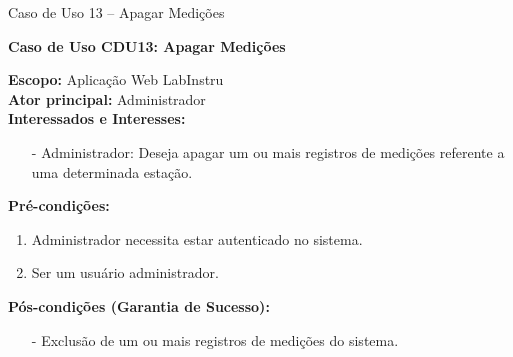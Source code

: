 \begin{mdframed}
\begin{flushleft}
\begin{itemize}
		\end{itemize}

		\end{flushleft}

	\end{mdframed}%


\begin{quadro}[h!]\caption{Caso de Uso 13 --  Apagar Medições}
\hfill
\end{quadro}
	\begin{mdframed}

		\textbf{Caso de Uso CDU13: Apagar Medições}\\

		\begin{flushleft}

		\textbf{Escopo:} Aplicação Web LabInstru\\

		\textbf{Ator principal:} Administrador\\

		\textbf{Interessados e Interesses:}
		\begin{itemize}
			\item[-] Administrador: Deseja apagar um ou mais registros de medições referente a uma determinada estação.
		\end{itemize}

		\textbf{Pré-condições:}\\
			 \begin{enumerate}
			 	\item{Administrador necessita estar autenticado no sistema.}
			 	\item{Ser um usuário administrador.}
			 \end{enumerate}

		\textbf{Pós-condições (Garantia de Sucesso):}
		\begin{itemize}
			\item[-] Exclusão de um ou mais registros de medições do sistema.
		\end{itemize}


\end{flushleft}
\end{mdframed}
